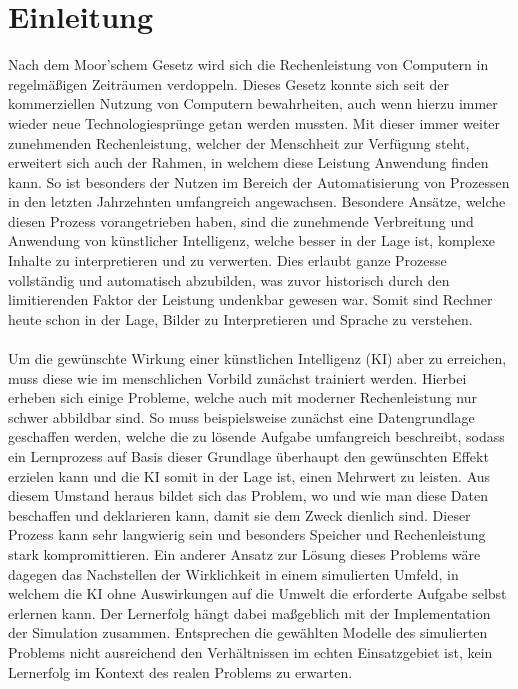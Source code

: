 \section{Einleitung} %

Nach dem Moor'schem Gesetz wird sich die Rechenleistung von Computern in regelmäßigen Zeiträumen verdoppeln. Dieses Gesetz konnte sich seit der kommerziellen Nutzung von Computern bewahrheiten, auch wenn hierzu immer wieder neue Technologiesprünge getan werden mussten. Mit dieser immer weiter zunehmenden Rechenleistung, welcher der Menschheit zur Verfügung steht, erweitert sich auch der Rahmen, in welchem diese Leistung Anwendung finden kann. So ist besonders der Nutzen im Bereich der Automatisierung von Prozessen in den letzten Jahrzehnten umfangreich angewachsen. Besondere Ansätze, welche diesen Prozess vorangetrieben haben, sind die zunehmende Verbreitung und Anwendung von künstlicher Intelligenz, welche besser in der Lage ist, komplexe Inhalte zu interpretieren und zu verwerten. Dies erlaubt ganze Prozesse vollständig und automatisch abzubilden, was zuvor historisch durch den limitierenden Faktor der Leistung undenkbar gewesen war. Somit sind Rechner heute schon in der Lage, Bilder zu Interpretieren und Sprache zu verstehen.
\\
\\
Um die gewünschte Wirkung einer künstlichen Intelligenz (KI) aber zu erreichen, muss diese wie im menschlichen Vorbild zunächst trainiert werden. Hierbei erheben sich einige Probleme, welche auch mit moderner Rechenleistung nur schwer abbildbar sind. So muss beispielsweise zunächst eine Datengrundlage geschaffen werden, welche die zu lösende Aufgabe umfangreich beschreibt, sodass ein Lernprozess auf Basis dieser Grundlage überhaupt den gewünschten Effekt erzielen kann und die KI somit in der Lage ist, einen Mehrwert zu leisten. Aus diesem Umstand heraus bildet sich das Problem, wo und wie man diese Daten beschaffen und deklarieren kann, damit sie dem Zweck dienlich sind. Dieser Prozess kann sehr langwierig sein und besonders Speicher und Rechenleistung stark kompromittieren. Ein anderer Ansatz zur Lösung dieses Problems wäre dagegen das Nachstellen der Wirklichkeit in einem simulierten Umfeld, in welchem die KI ohne Auswirkungen auf die Umwelt die erforderte Aufgabe selbst erlernen kann. Der Lernerfolg hängt dabei maßgeblich mit der Implementation der Simulation zusammen. Entsprechen die gewählten Modelle des simulierten Problems nicht ausreichend den Verhältnissen im echten Einsatzgebiet ist, kein Lernerfolg im Kontext des realen Problems zu erwarten.

